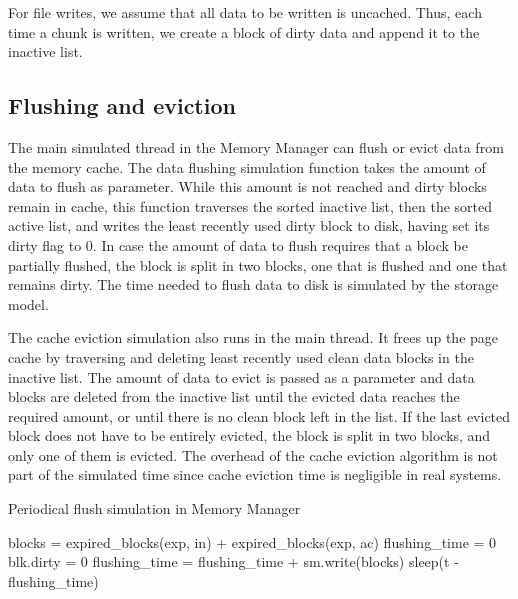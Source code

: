 For file writes, we assume that all data to be written is
uncached. Thus, each time a chunk is written, we create a block of dirty data
and append it to the inactive list.

\subsection{Flushing and eviction}

The main simulated thread in the Memory Manager can flush or evict data from the
memory cache. The data flushing simulation
function takes the amount of data to flush as parameter. While
this amount is not reached and dirty
blocks remain in cache, this function traverses the sorted
inactive list, then the sorted active list, and writes the
least recently used dirty block to disk, having set its dirty
flag to 0. In case the amount of data to flush requires that a
block be partially flushed, the block is split in two blocks,
one that is flushed and one that remains dirty. The time needed
to flush data to disk is simulated by the storage model.

The cache eviction simulation also runs in
the main thread. It frees up the page cache by traversing and deleting
least recently used clean data blocks in the inactive list.
The amount of data to evict is passed as a parameter and data blocks are deleted
from the inactive list until the evicted data reaches the required amount,
or until there is no clean block left in the list.
If the last evicted block does not have to be entirely evicted, the block is split in two blocks,
and only one of them is evicted.
The overhead of the cache eviction algorithm is not part of the simulated time
since cache eviction time is negligible in real systems. %

\begin{algorithm}[H]
\caption{Periodical flush simulation in Memory Manager}
\label{alg:pdflush}
    \small
    \begin{algorithmic}[1]
        \Input
           \EndInput
            \State blocks = expired\_blocks(exp, in) + expired\_blocks(exp, ac)
            \State flushing\_time = 0
              \State blk.dirty = 0 
              \State flushing\_time = flushing\_time + sm.write(blocks)
            \EndFor
                \State sleep(t - flushing\_time)
            \EndIf  
        \EndWhile
    \end{algorithmic}
\end{algorithm}

